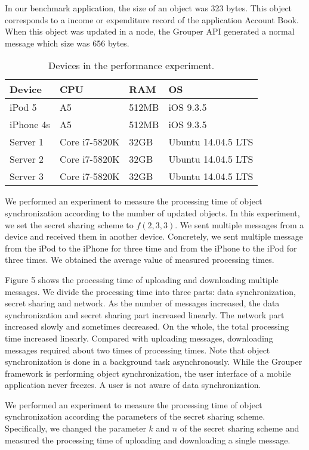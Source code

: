 In our benchmark application, the size of an object was 323 bytes.
This object corresponds to a income or expenditure record of the application Account Book.
When this object was updated in a node, the Grouper API generated a normal message which size was 656 bytes.

\begin{table}[t]
	\footnotesize
	\centering  
	\caption{Devices in the performance experiment.}
	\begin{tabular}{llll}
		\hline
		\textbf{Device} & \textbf{CPU} & \textbf{RAM} & \textbf{OS} \\ \hline
		iPod 5 & A5 & 512MB & iOS 9.3.5 \\
		iPhone 4s & A5 & 512MB & iOS 9.3.5 \\
		Server 1 & Core i7-5820K & 32GB & Ubuntu 14.04.5 LTS \\
		Server 2 & Core i7-5820K & 32GB & Ubuntu 14.04.5 LTS \\
		Server 3 & Core i7-5820K & 32GB & Ubuntu 14.04.5 LTS \\ \hline
	\end{tabular}
\end{table}

We performed an experiment to measure the processing time of object synchronization according to the number of updated objects.
In this experiment, we set the secret sharing scheme to ${f(2, 3, 3)}$.
We sent multiple messages from a device and received them in another device. 
Concretely, we sent multiple message from the iPod to the iPhone for three time and from the iPhone to the iPod for three times.
We obtained the average value of measured processing times.

Figure 5 shows the processing time of uploading and downloading multiple messages.
We divide the processing time into three parts: data synchronization, secret sharing and network.
As the number of messages increased, the data synchronization and secret sharing part increased linearly. 
The network part increased slowly and sometimes decreased.
On the whole, the total processing time increased linearly.
Compared with uploading messages, downloading messages required about two times of processing times.
Note that object synchronization is done in a background task asynchronously.
While the Grouper framework is performing object synchronization, the user interface of a mobile application never freezes.
A user is not aware of data synchronization.

We performed an experiment to measure the processing time of object synchronization according the parameters of the secret sharing scheme.
Specifically, we changed the parameter ${k}$  and ${n}$ of the secret sharing scheme and measured the processing time of uploading and downloading a single message.

